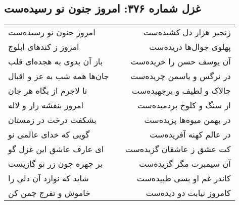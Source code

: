 \begin{center}
\section*{غزل شماره ۳۷۶: امروز جنون نو رسیده‌ست}
\label{sec:0376}
\begin{longtable}{l p{0.5cm} r}
امروز جنون نو رسیده‌ست
&&
زنجیر هزار دل کشیده‌ست
\\
امروز ز کندهای ابلوج
&&
پهلوی جوال‌ها دریده‌ست
\\
باز آن بدوی به هجده‌ای قلب
&&
آن یوسف حسن را خریده‌ست
\\
جان‌ها همه شب به عز و اقبال
&&
در نرگس و یاسمن چریده‌ست
\\
تا لاجرم از بگاه هر جان
&&
چالاک و لطیف و برجهیده‌ست
\\
امروز بنفشه زار و لاله
&&
از سنگ و کلوخ بردمیده‌ست
\\
بشکفت درخت در زمستان
&&
در بهمن میوه‌ها پزیده‌ست
\\
گویی که خدای عالمی نو
&&
در عالم کهنه آفریده‌ست
\\
ای عارف عاشق این غزل گو
&&
کت عشق ز عاشقان گزیده‌ست
\\
بر چهره چون زر تو گازیست
&&
آن سیمبرت مگر گزیده‌ست
\\
شاید که نوازد آن دلی را
&&
کاندر غم او بسی طپیده‌ست
\\
خاموش و تفرج چمن کن
&&
کامروز نیابت دو دیده‌ست
\\
\end{longtable}
\end{center}
